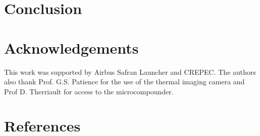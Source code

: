 \documentclass[11pt,review,times]{elsarticle}
\begin{document}
\FloatBarrier



							\section{Conclusion}



							\section{Acknowledgements}

This work was supported by Airbus Safran Launcher and CREPEC. 
The authors also thank Prof. G.S. Patience for the use of the thermal imaging camera and Prof D. Therriault for access to the microcompounder. 

							\section*{References}




\end{document}
